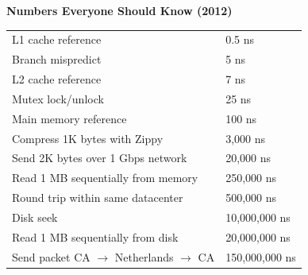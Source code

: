 \documentclass{article}
\begin{document}
    \textbf{Numbers Everyone Should Know (2012)}
    \begin{table}[H]
    \begin{tabular}{|l|l|}
    \hline
        L1 cache reference & 0.5 ns  \\
        Branch mispredict &  5 ns \\
        L2 cache reference & 7 ns \\
        Mutex lock/unlock & 25 ns \\
        Main memory reference & 100 ns \\
        Compress 1K bytes with Zippy & 3,000 ns \\
        Send 2K bytes over 1 Gbps network & 20,000 ns \\
        Read 1 MB sequentially from memory & 250,000 ns \\
        Round trip within same datacenter & 500,000 ns \\
        Disk seek & 10,000,000 ns \\
        Read 1 MB sequentially from disk & 20,000,000 ns \\
        Send packet CA $\to$ Netherlands $\to$ CA & 150,000,000 ns \\
    \hline
    \end{tabular}
    \end{table}
    
\end{document}
